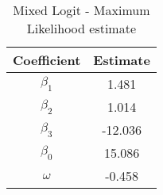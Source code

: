 \begin{table}[h!]
\centering
\caption{Mixed Logit - Maximum Likelihood estimate}\label{tab:mixed-mv}
\begin{tabular}{cc}
 \hline 
Coefficient & Estimate \\ \hline 
$\beta_1$ & 1.481 \\ 
$\beta_2$ & 1.014 \\ 
$\beta_3$ & -12.036 \\ 
$\beta_0$ & 15.086 \\ 
$\omega$ & -0.458 \\ 
\hline
\end{tabular}
\end{table}

